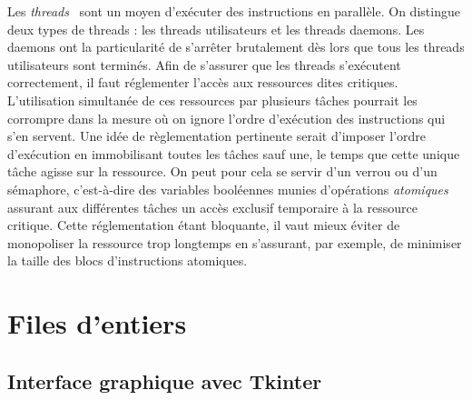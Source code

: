 \documentclass{article}
\begin{document}
Les \textit{threads}~\cite{refThread} sont un moyen d’exécuter des instructions en parallèle. On distingue deux types de threads : les threads utilisateurs et les threads daemons. Les daemons ont la particularité de s’arrêter brutalement dès lors que tous les threads utilisateurs sont terminés.
\medbreak
Afin de s’assurer que les threads s’exécutent correctement, il faut réglementer l’accès aux ressources dites critiques. L’utilisation simultanée de ces ressources par plusieurs tâches pourrait les corrompre dans la mesure où on ignore l’ordre d’exécution des instructions qui s’en servent.
\medbreak
Une idée de règlementation pertinente serait d’imposer l’ordre d’exécution en immobilisant toutes les tâches sauf une, le temps que cette unique tâche agisse sur la ressource. On peut pour cela se servir d’un verrou ou d’un sémaphore, c’est-à-dire des variables booléennes munies d’opérations \textit{atomiques}~\cite{refAtomicite} assurant aux différentes tâches un accès exclusif temporaire à la ressource critique. Cette réglementation étant bloquante, il vaut mieux éviter de monopoliser la ressource trop longtemps en s’assurant, par exemple, de minimiser la taille des blocs d’instructions atomiques.

\section{Files d'entiers}
\subsection{Interface graphique avec Tkinter}
\end{document}
